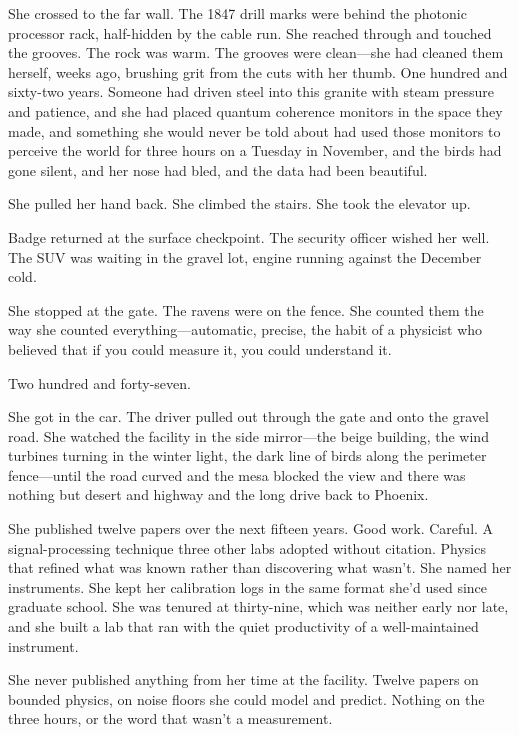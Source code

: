 She crossed to the far wall. The 1847 drill marks were behind the photonic processor rack, half-hidden by the cable run. She reached through and touched the grooves. The rock was warm. The grooves were clean---she had cleaned them herself, weeks ago, brushing grit from the cuts with her thumb. One hundred and sixty-two years. Someone had driven steel into this granite with steam pressure and patience, and she had placed quantum coherence monitors in the space they made, and something she would never be told about had used those monitors to perceive the world for three hours on a Tuesday in November, and the birds had gone silent, and her nose had bled, and the data had been beautiful.

She pulled her hand back. She climbed the stairs. She took the elevator up.

Badge returned at the surface checkpoint. The security officer wished her well. The SUV was waiting in the gravel lot, engine running against the December cold.

She stopped at the gate. The ravens were on the fence. She counted them the way she counted everything---automatic, precise, the habit of a physicist who believed that if you could measure it, you could understand it.

Two hundred and forty-seven.

She got in the car. The driver pulled out through the gate and onto the gravel road. She watched the facility in the side mirror---the beige building, the wind turbines turning in the winter light, the dark line of birds along the perimeter fence---until the road curved and the mesa blocked the view and there was nothing but desert and highway and the long drive back to Phoenix.

\scenebreak

She published twelve papers over the next fifteen years. Good work. Careful. A signal-processing technique three other labs adopted without citation. Physics that refined what was known rather than discovering what wasn't. She named her instruments. She kept her calibration logs in the same format she'd used since graduate school. She was tenured at thirty-nine, which was neither early nor late, and she built a lab that ran with the quiet productivity of a well-maintained instrument.

She never published anything from her time at the facility. Twelve papers on bounded physics, on noise floors she could model and predict. Nothing on the three hours, or the word that wasn't a measurement.


